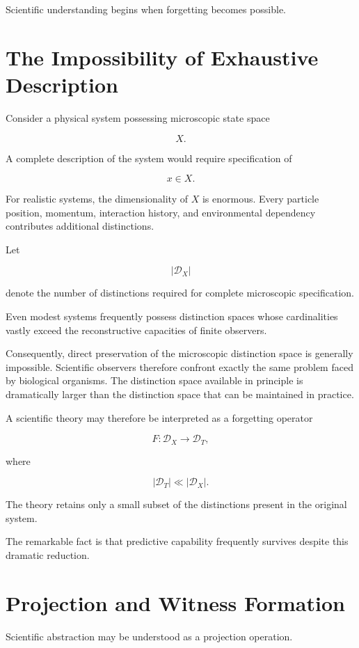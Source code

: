 \documentclass[12pt,oneside]{book}
\theoremstyle{plain} \newtheorem{theorem}{Theorem}[chapter] \newtheorem{lemma}[theorem]{Lemma} \newtheorem{proposition}[theorem]{Proposition} \newtheorem{corollary}[theorem]{Corollary}
\theoremstyle{definition} \newtheorem{definition}[theorem]{Definition} \newtheorem{axiom}[theorem]{Axiom} \newtheorem{construction}[theorem]{Construction}
\theoremstyle{remark} \newtheorem{remark}[theorem]{Remark} \newtheorem{example}[theorem]{Example}
\newcommand{\D}{\mathcal{D}} \newcommand{\R}{\mathcal{R}} \newcommand{\F}{\mathcal{F}} \newcommand{\U}{\mathcal{U}} \newcommand{\M}{\mathcal{M}} \newcommand{\G}{\Gamma}
\begin{document}
Scientific understanding begins when forgetting becomes possible.

\section{The Impossibility of Exhaustive Description}

Consider a physical system possessing microscopic state space

\[
X.
\]

A complete description of the system would require specification of

\[
x\in X.
\]

For realistic systems, the dimensionality of $X$ is enormous. Every particle position, momentum, interaction history, and environmental dependency contributes additional distinctions.

Let

\[
|\D_X|
\]

denote the number of distinctions required for complete microscopic specification.

Even modest systems frequently possess distinction spaces whose cardinalities vastly exceed the reconstructive capacities of finite observers.

Consequently, direct preservation of the microscopic distinction space is generally impossible. Scientific observers therefore confront exactly the same problem faced by biological organisms. The distinction space available in principle is dramatically larger than the distinction space that can be maintained in practice.

A scientific theory may therefore be interpreted as a forgetting operator

\[
F
:
\D_X
\rightarrow
\D_T,
\]

where

\[
|\D_T|
\ll
|\D_X|.
\]

The theory retains only a small subset of the distinctions present in the original system.

The remarkable fact is that predictive capability frequently survives despite this dramatic reduction.

\section{Projection and Witness Formation}

Scientific abstraction may be understood as a projection operation.
\end{document}
